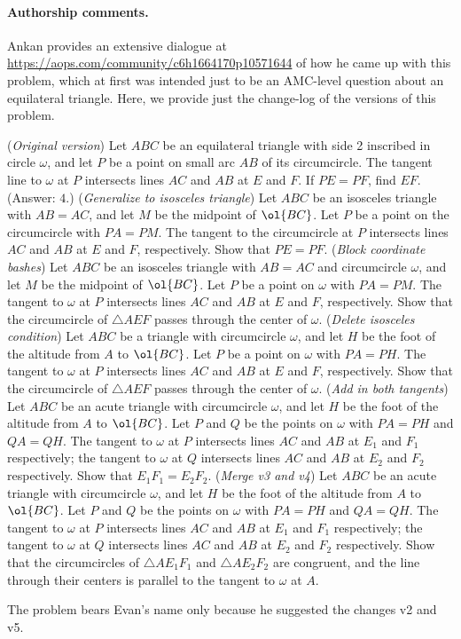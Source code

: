 \documentclass[11pt]{scrartcl}
\begin{document}
\paragraph{Authorship comments.}
Ankan provides an extensive
dialogue at \url{https://aops.com/community/c6h1664170p10571644}
of how he came up with this problem,
which at first was intended just to be an AMC-level question
about an equilateral triangle.
Here, we provide just the change-log of the versions of this problem.
\begin{enumerate}
  \ii[0.] (\emph{Original version}) Let $ABC$ be an equilateral triangle with side 2 inscribed in circle $\omega$, and let $P$ be a point on small arc $AB$ of its circumcircle. The tangent line to $\omega$ at $P$ intersects lines $AC$ and $AB$ at $E$ and $F$. If $PE = PF$, find $EF$.
  (Answer: $4$.)
  \ii (\emph{Generalize to isosceles triangle}) Let $ABC$ be an isosceles triangle with $AB = AC$, and let $M$ be the midpoint of $\ol{BC}$. Let $P$ be a point on the circumcircle with $PA = PM$. The tangent to the circumcircle at $P$ intersects lines $AC$ and $AB$ at $E$ and $F$, respectively. Show that $PE = PF$.
  \ii (\emph{Block coordinate bashes}) Let $ABC$ be an isosceles triangle with $AB = AC$ and circumcircle $\omega$, and let $M$ be the midpoint of $\ol{BC}$. Let $P$ be a point on $\omega$ with $PA = PM$. The tangent to $\omega$ at $P$ intersects lines $AC$ and $AB$ at $E$ and $F$, respectively. Show that the circumcircle of $\triangle AEF$ passes through the center of $\omega$.
  \ii (\emph{Delete isosceles condition}) Let $ABC$ be a triangle with circumcircle $\omega$, and let $H$ be the foot of the altitude from $A$ to $\ol{BC}$. Let $P$ be a point on $\omega$ with $PA = PH$. The tangent to $\omega$ at $P$ intersects lines $AC$ and $AB$ at $E$ and $F$, respectively. Show that the circumcircle of $\triangle AEF$ passes through the center of $\omega$.
  \ii (\emph{Add in both tangents}) Let $ABC$ be an acute triangle with circumcircle $\omega$, and let $H$ be the foot of the altitude from $A$ to $\ol{BC}$. Let $P$ and $Q$ be the points on $\omega$ with $PA = PH$ and $QA = QH$. The tangent to $\omega$ at $P$ intersects lines $AC$ and $AB$ at $E_1$ and $F_1$ respectively; the tangent to $\omega$ at $Q$ intersects lines $AC$ and $AB$ at $E_2$ and $F_2$ respectively. Show that $E_1F_1 = E_2F_2$.
  \ii (\emph{Merge v3 and v4}) Let $ABC$ be an acute triangle with circumcircle $\omega$, and let $H$ be the foot of the altitude from $A$ to $\ol{BC}$. Let $P$ and $Q$ be the points on $\omega$ with $PA = PH$ and $QA = QH$. The tangent to $\omega$ at $P$ intersects lines $AC$ and $AB$ at $E_1$ and $F_1$ respectively; the tangent to $\omega$ at $Q$ intersects lines $AC$ and $AB$ at $E_2$ and $F_2$ respectively. Show that the circumcircles of $\triangle AE_1F_1$ and $\triangle AE_2F_2$ are congruent, and the line through their centers is parallel to the tangent to $\omega$ at $A$.
\end{enumerate}
The problem bears Evan's name only because he suggested the changes v2 and v5.
\pagebreak
\end{document}
